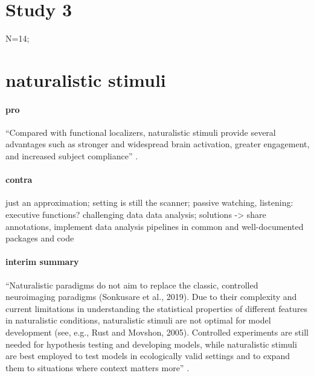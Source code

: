 \section{Study 3}

N=14;


\section{naturalistic stimuli}

\paragraph{pro}




%
``Compared with functional localizers, naturalistic stimuli provide several
advantages such as stronger and widespread brain activation, greater engagement,
and increased subject compliance'' \citep{jiahui2020predicting}.

\paragraph{contra}
%
just an approximation;
%
setting is still the scanner;
%
passive watching, listening: executive functions?
%
challenging data data analysis;
%
solutions -> share annotations,
%
implement data analysis pipelines in common and well-documented packages and code


\paragraph{interim summary}

``Naturalistic paradigms do not aim to replace the classic, controlled
neuroimaging paradigms (Sonkusare et al., 2019). Due to their complexity and
current limitations in understanding the statistical properties of different
features in naturalistic conditions, naturalistic stimuli are not optimal for
model development (see, e.g., Rust and Movshon, 2005). Controlled experiments
are still needed for hypothesis testing and developing models, while
naturalistic stimuli are best employed to test models in ecologically valid
settings and to expand them to situations where context matters
more'' \citep{saarimaki2021naturalistic}.

